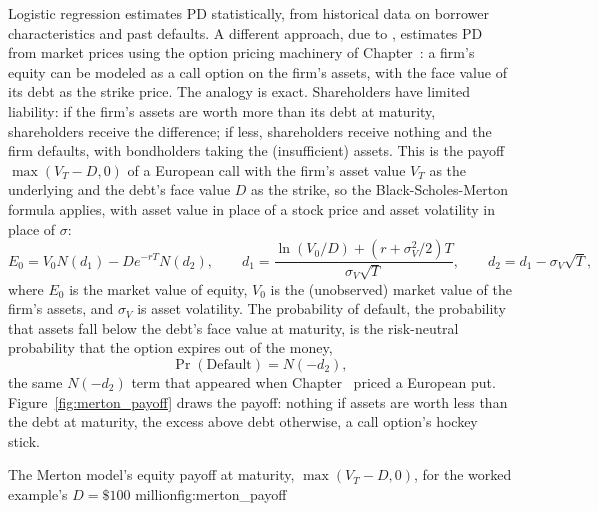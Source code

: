 \documentclass[../ai_in_finance]{subfiles}
\begin{document}
Logistic regression estimates PD statistically, from historical data on borrower characteristics and past defaults. A different approach, due to \textcite{merton1974pricing}, estimates PD from market prices using the option pricing machinery of Chapter~: a firm's equity can be modeled as a call option on the firm's assets, with the face value of its debt as the strike price.
The analogy is exact. Shareholders have limited liability: if the firm's assets are worth more than its debt at maturity, shareholders receive the difference; if less, shareholders receive nothing and the firm defaults, with bondholders taking the (insufficient) assets.
This is the payoff $\max(V_T - D, 0)$ of a European call with the firm's asset value $V_T$ as the underlying and the debt's face value $D$ as the strike, so the Black-Scholes-Merton formula applies, with asset value in place of a stock price and asset volatility in place of $\sigma$:
\begin{equation}
\label{eq:creditrisk-merton}
E_0 = V_0 N(d_1) - D e^{-rT} N(d_2), \qquad d_1 = \frac{\ln(V_0/D) + (r + \sigma_V^2/2)T}{\sigma_V\sqrt{T}}, \qquad d_2 = d_1 - \sigma_V\sqrt{T},
\end{equation}
where $E_0$ is the market value of equity, $V_0$ is the (unobserved) market value of the firm's assets, and $\sigma_V$ is asset volatility. The probability of default, the probability that assets fall below the debt's face value at maturity, is the risk-neutral probability that the option expires out of the money,
$$\Pr(\text{Default}) = N(-d_2),$$
the same $N(-d_2)$ term that appeared when Chapter~ priced a European put. Figure~\ref{fig:merton_payoff} draws the payoff: nothing if assets are worth less than the debt at maturity, the excess above debt otherwise, a call option's hockey stick.

\begin{bookfigure}[htbp]{The Merton model's equity payoff at maturity, $\max(V_T-D,0)$, for the worked example's $D=\$100$ million}{fig:merton_payoff}
\end{bookfigure}
\end{document}
